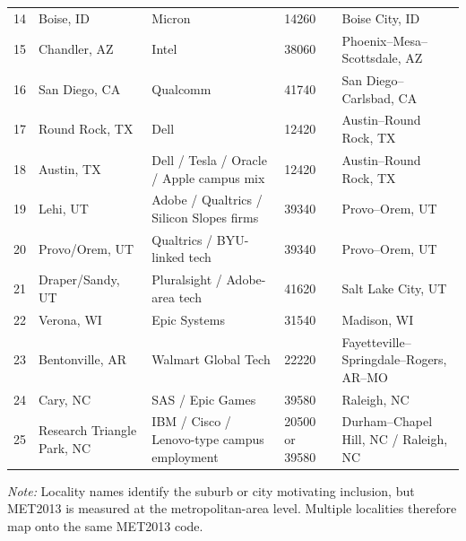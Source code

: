 \documentclass[12pt]{article}
\begin{document}
\begin{table}[!htbp]
\begin{tabularx}{\textwidth}{@{}r C{0.15\textwidth} Y C{0.10\textwidth} Y@{}}
14 & Boise, ID & Micron & 14260 & Boise City, ID \\
15 & Chandler, AZ & Intel & 38060 & Phoenix--Mesa--Scottsdale, AZ \\
16 & San Diego, CA & Qualcomm & 41740 & San Diego--Carlsbad, CA \\
17 & Round Rock, TX & Dell & 12420 & Austin--Round Rock, TX \\
18 & Austin, TX & Dell / Tesla / Oracle / Apple campus mix & 12420 & Austin--Round Rock, TX \\
19 & Lehi, UT & Adobe / Qualtrics / Silicon Slopes firms & 39340 & Provo--Orem, UT \\
20 & Provo/Orem, UT & Qualtrics / BYU-linked tech & 39340 & Provo--Orem, UT \\
21 & Draper/Sandy, UT & Pluralsight / Adobe-area tech & 41620 & Salt Lake City, UT \\
22 & Verona, WI & Epic Systems & 31540 & Madison, WI \\
23 & Bentonville, AR & Walmart Global Tech & 22220 & Fayetteville--Springdale--Rogers, AR--MO \\
24 & Cary, NC & SAS / Epic Games & 39580 & Raleigh, NC \\
25 & Research Triangle Park, NC & IBM / Cisco / Lenovo-type campus employment & 20500 or 39580 & Durham--Chapel Hill, NC / Raleigh, NC \\
\bottomrule
\end{tabularx}

\vspace{0.25em}
\begin{minipage}{0.96\textwidth}
\tiny
\textit{Note:} Locality names identify the suburb or city motivating inclusion, but MET2013 is measured at the metropolitan-area level. Multiple localities therefore map onto the same MET2013 code.
\end{minipage}
\end{table}

\newpage
\printbibliography
\end{document}
